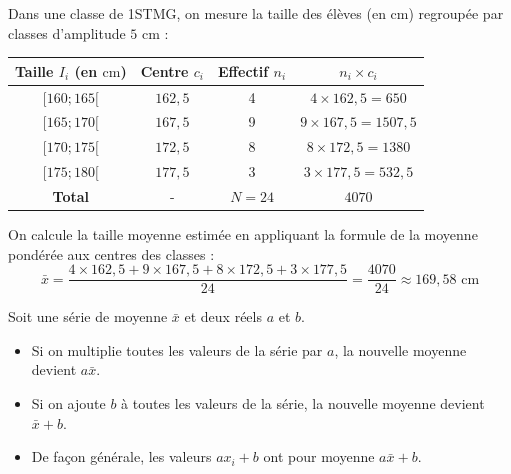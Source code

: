 \begin{ex}
	Dans une classe de 1STMG, on mesure la taille des élèves (en $\text{cm}$) regroupée par classes d'amplitude $5\text{ cm}$ :

	\begin{center}
		\begin{tabular}{|c|c|c|c|}\hline
			\rowcolor{gray!30}
			Taille $I_i$ (en $\text{cm}$) & Centre $c_i$ & Effectif $n_i$ & $n_i \times c_i$              \\ \hline
			$[160 ; 165[$                 & $162{,}5$    & 4              & $4 \times 162{,}5 = 650$      \\ \hline
			$[165 ; 170[$                 & $167{,}5$    & 9              & $9 \times 167{,}5 = 1507{,}5$ \\ \hline
			$[170 ; 175[$                 & $172{,}5$    & 8              & $8 \times 172{,}5 = 1380$     \\ \hline
			$[175 ; 180[$                 & $177{,}5$    & 3              & $3 \times 177{,}5 = 532{,}5$  \\ \hline
			\textbf{Total}                & -            & $N = 24$       & $4070$                        \\ \hline
		\end{tabular}
	\end{center}

	On calcule la taille moyenne estimée en appliquant la formule de la moyenne pondérée aux centres des classes :
	\[
		\bar{x} = \dfrac{4 \times 162{,}5 + 9 \times 167{,}5 + 8 \times 172{,}5 + 3 \times 177{,}5}{24} = \dfrac{4070}{24} \approx 169{,}58\text{ cm}
	\]
\end{ex}

\newpage

\begin{prop}
	Soit une série de moyenne $\bar{x}$ et deux réels $a$ et $b$.
	\begin{itemize}
		\item Si on multiplie toutes les valeurs de la série par $a$, la nouvelle moyenne devient $a\bar{x}$.
		\item Si on ajoute $b$ à toutes les valeurs de la série, la nouvelle moyenne devient $\bar{x} + b$.
		\item De façon générale, les valeurs $a x_i + b$ ont pour moyenne $a\bar{x} + b$.
	\end{itemize}
\end{prop}

